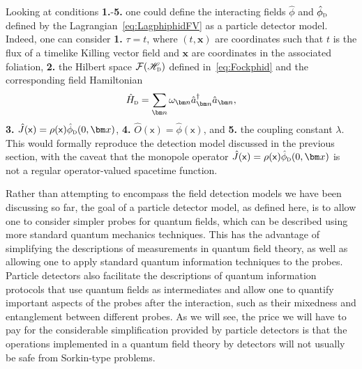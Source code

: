 \documentclass[letterpaper,12pt,titlepage,oneside,final]{book}
\newcommand{\mf}{\mathsf}%
\newcommand{\tc}[1]{\textsc{#1}}
\begin{document}
Looking at conditions \textbf{1.}-\textbf{5.} one could define the interacting fields $\hat{\phi}$ and $\hat{\phi}_\tc{d}$ defined by the Lagrangian~\eqref{eq:LagphiphidFV} as a particle detector model. Indeed, one can consider \textbf{1.} $\tau = t$, where $(t,\bm x)$ are coordinates such that $t$ is the flux of a timelike Killing vector field and $\bm x$ are coordinates in the associated foliation, \textbf{2.} the Hilbert space $\mathcal{F}(\mathscr{H}_\tc{d})$ defined in~\eqref{eq:Fockphid} and the corresponding field Hamiltonian
\begin{equation}\label{eq:HIgeneralPD}
    \hat{H}_\tc{d} = \sum_{\bm n} \omega_{\bm n} \hat{a}_{\bm n}^\dagger \hat{a}_{\bm n},
\end{equation}
\textbf{3.} $\hat{J}(\mf x) = \rho(\mf x) \hat{\phi}_{\tc{d}}(0,\bm x)$, \textbf{4.} $\hat{O}(\mf x) = \hat{\phi}(\mf x)$, and \textbf{5.} the coupling constant $\lambda$. This would formally reproduce the detection model discussed in the previous section, with the caveat that the monopole operator $\hat{J}(\mf x) = \rho(\mf x) \hat{\phi}_{\tc{d}}(0,\bm x)$ is not a regular operator-valued spacetime function.

Rather than attempting to encompass the field detection models we have been discussing so far, the goal of a particle detector model, as defined here, is to allow one to consider simpler probes for quantum fields, which can be described using more standard quantum mechanics techniques. This has the advantage of simplifying the descriptions of measurements in quantum field theory, as well as allowing one to apply standard quantum information techniques to the probes. Particle detectors also facilitate the descriptions of quantum information protocols that use quantum fields as intermediates and allow one to quantify important aspects of the probes after the interaction, such as their mixedness and entanglement between different probes. As we will see, the price we will have to pay for the considerable simplification provided by particle detectors is that the operations implemented in a quantum field theory by detectors will not usually be safe from Sorkin-type problems.
\end{document}
